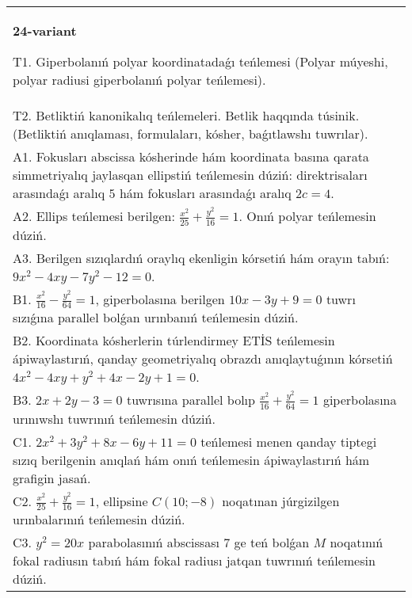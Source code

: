 \documentclass{article}
\begin{document}
\begin{tabular}{m{17cm}}
\textbf{24-variant}
\newline

T1. Giperbolanıń polyar koordinatadaǵı teńlemesi (Polyar múyeshi, polyar radiusi giperbolanıń polyar teńlemesi).\\

T2. Betliktiń kanonikalıq teńlemeleri. Betlik haqqında túsinik. (Betliktiń anıqlaması, formulaları, kósher, baǵıtlawshı tuwrılar).\\

A1. Fokusları abscissa kósherinde hám koordinata basına qarata simmetriyalıq jaylasqan ellipstiń teńlemesin dúziń: direktrisaları arasındaǵı aralıq $5$ hám fokusları arasındaǵı aralıq $2 c=4$.\\

A2. Ellips teńlemesi berilgen: $\frac{x^2}{25}+\frac{y^2}{16}=1$. Onıń polyar teńlemesin dúziń.\\

A3. Berilgen sızıqlardıń oraylıq ekenligin kórsetiń hám orayın tabıń: $9 x^{2}-4 xy-7 y^{2}-12=0$.\\

B1. $\frac{x^{2}}{16} - \frac{y^{2}}{64} = 1$, giperbolasına berilgen $10x - 3y + 9 = 0$ tuwrı sızıǵına parallel bolǵan urınbanıń teńlemesin dúziń.  \\

B2. Koordinata kósherlerin túrlendirmey ETİS teńlemesin ápiwaylastırıń, qanday geometriyalıq obrazdı anıqlaytuǵının kórsetiń $4x^{2} - 4xy + y^{2} + 4x - 2y + 1 = 0$.  \\

B3. $2x + 2y - 3 = 0$ tuwrısına parallel bolıp $\frac{x^{2}}{16} + \frac{y^{2}}{64} = 1$ giperbolasına urınıwshı tuwrınıń teńlemesin dúziń.  \\

C1. $2x^{2} + 3y^{2} + 8x - 6y + 11 = 0$ teńlemesi menen qanday tiptegi sızıq berilgenin anıqlań hám onıń teńlemesin ápiwaylastırıń hám grafigin jasań.  \\

C2. $\frac{x^{2}}{25} + \frac{y^{2}}{16} = 1$, ellipsine $C(10; - 8)$ noqatınan júrgizilgen urınbalarınıń teńlemesin dúziń.  \\

C3. $y^{2} = 20x$ parabolasınıń abscissası 7 ge teń bolǵan $M$ noqatınıń fokal radiusın tabıń hám fokal radiusı jatqan tuwrınıń teńlemesin dúziń.  \\

\end{tabular}
\vspace{1cm}
\end{document}
